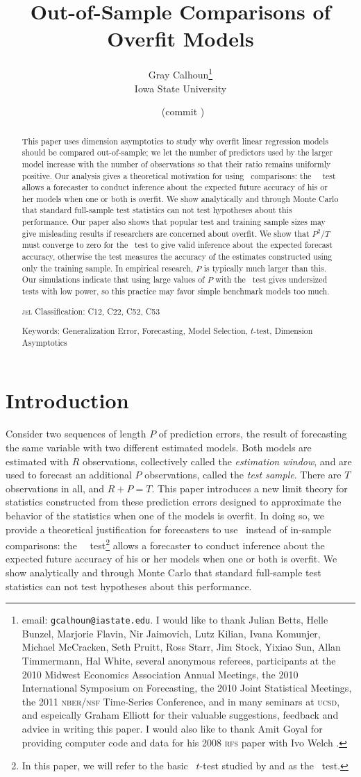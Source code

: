 \documentclass[11pt]{article}
\date{\dinfo\ (commit \hinfo)}
\title{Out-of-Sample Comparisons of Overfit Models}
\author{Gray Calhoun\thanks{email: \texttt{gcalhoun@iastate.edu}. I
    would like to thank Julian Betts, Helle Bunzel, Marjorie Flavin,
    Nir Jaimovich, Lutz Kilian, Ivana Komunjer, Michael McCracken,
    Seth Pruitt, Ross Starr, Jim Stock, Yixiao Sun, Allan Timmermann,
    Hal White, several anonymous referees, participants at the 2010
    Midwest Economics Association Annual Meetings, the 2010
    International Symposium on Forecasting, the 2010 Joint Statistical
    Meetings, the 2011 \textsc{nber}/\textsc{nsf} Time-Series
    Conference, and in many seminars at \textsc{ucsd}, and espeically
    Graham Elliott for their valuable suggestions, feedback and advice
    in writing this paper.  I would also like to thank Amit Goyal for
    providing computer code and data for his 2008 \textsc{rfs} paper
    with Ivo Welch \citep{GoW:08}.} \\ Iowa State University}
\begin{document}
\maketitle

\begin{abstract}\thispagestyle{empty}\noindent
  This paper uses dimension asymptotics to study why overfit linear
  regression models should be compared out-of-sample; we let the
  number of predictors used by the larger model increase with the
  number of observations so that their ratio remains uniformly
  positive.  Our analysis gives a theoretical motivation for using
  \oos\ comparisons: the \dmw\ \oos\ test allows a forecaster to
  conduct inference about the expected future accuracy of his or her
  models when one or both is overfit.  We show analytically and
  through Monte Carlo that standard full-sample test statistics can
  not test hypotheses about this performance.  Our paper also shows
  that popular test and training sample sizes may give misleading
  results if researchers are concerned about overfit.  We show that
  $P^2/T$ must converge to zero for the \dmw\ test to give valid
  inference about the expected forecast accuracy, otherwise the test
  measures the accuracy of the estimates constructed using only the
  training sample.  In empirical research, $P$ is typically much
  larger than this.  Our simulations indicate that using large values
  of $P$ with the \dmw\ test gives undersized tests with low power, so
  this practice may favor simple benchmark models too much.

\noindent \textsc{jel} Classification: C12, C22, C52, C53

\noindent Keywords: Generalization Error, Forecasting, Model
Selection, $t$-test, Dimension Asymptotics
\end{abstract}
\newpage

\section{Introduction}\label{sec:introduction}
Consider two sequences of length $P$ of prediction errors, the result
of forecasting the same variable with two different estimated models.
Both models are estimated with $R$ observations, collectively called
the {\em estimation window}, and are used to forecast an additional
$P$ observations, called the {\em test sample}.  There are $T$
observations in all, and $R+P=T$.  This paper introduces a new limit
theory for statistics constructed from these prediction errors
designed to approximate the behavior of the statistics when one of the
models is overfit.  In doing so, we provide a theoretical
justification for forecasters to use \oos\ instead of in-sample
comparisons: the \dmw\ \oos\ test\footnote{In this paper, we will
  refer to the basic \oos\ $t$-test studied by \citet{DiM:95} and
  \citet{Wes:96} as the \dmw\ test.} allows a forecaster to conduct
inference about the expected future accuracy of his or her models when
one or both is overfit.  We show analytically and through Monte Carlo
that standard full-sample test statistics can not test hypotheses
about this performance.
\end{document}
